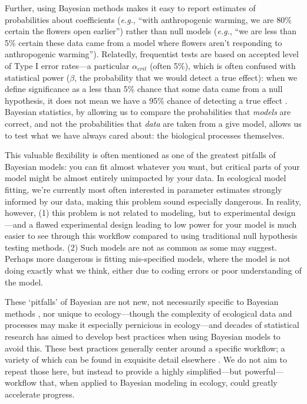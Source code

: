 \documentclass[11pt]{article}
\begin{document}
{%
Further, using Bayesian methods makes it easy to report estimates of probabilities about coefficients (\emph{e.g.}, ``with anthropogenic warming, we are 80\% certain the flowers open earlier'') rather than null models (\emph{e.g.}, ``we are less than 5\% certain these data came from a model where flowers aren't responding to anthropogenic warming''). Relatedly, frequentist tests are based on accepted level of Type I error rates---a particular $\alpha_{crit}$ (often 5\%), which is often confused with statistical power ($\beta$, the probability that we would detect a true effect): when we define significance as a less than 5\% chance that some data came from a null hypothesis, it does not mean we have a 95\% chance of detecting a true effect \citep[indeed statistical power is often extremely low in ecological studies,][]{jennions2003survey}. Bayesian statistics, by allowing us to compare the probabilities that \emph{models} are correct, and not the probabilities that \emph{data} are taken from a give model, allows us to test what we have always cared about: the biological processes themselves.

This valuable flexibility is often mentioned as one of the greatest pitfalls of Bayesian models: you can fit almost whatever you want, but critical parts of your model might be almost entirely unimpacted by your data. In ecological model fitting, we're currently most often interested in parameter estimates strongly informed by our data, making this problem sound especially dangerous. In reality, however, (1) this problem is not related to modeling, but to experimental design---and a flawed experimental design leading to low power for your model is much easier to see through this workflow compared to using traditional null hypothesis testing methods. (2) Such models are not as common as some may suggest. Perhaps more dangerous is fitting mis-specified models, where the model is not doing exactly what we think, either due to coding errors or poor understanding of the model. 

These `pitfalls' of Bayesian are not new, not necessarily specific to Bayesian methods \citep{low2014rising}, nor unique to ecology---though the complexity of ecological data and processes may make it especially pernicious in ecology---and decades of statistical research has aimed to develop best practices when using Bayesian models to avoid this. These best practices generally center around a specific workflow; a variety of which can be found in exquisite detail elsewhere \citep{betanworkflow,grinsztajn2021,vandeschoot2021}. We do not aim to repeat those here, but instead to provide a highly simplified---but powerful---workflow that, when applied to Bayesian modeling in ecology, could greatly accelerate progress. %

}
\end{document}
